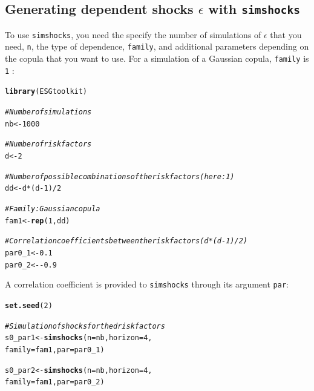 \documentclass[a4paper]{article}\usepackage[]{graphicx}\usepackage[]{color}
\makeatletter
\newcommand{\hlnum}[1]{\textcolor[rgb]{0.686,0.059,0.569}{#1}}%
\newcommand{\hlcom}[1]{\textcolor[rgb]{0.678,0.584,0.686}{\textit{#1}}}%
\newcommand{\hlopt}[1]{\textcolor[rgb]{0,0,0}{#1}}%
\newcommand{\hlstd}[1]{\textcolor[rgb]{0.345,0.345,0.345}{#1}}%
\newcommand{\hlkwb}[1]{\textcolor[rgb]{0.69,0.353,0.396}{#1}}%
\newcommand{\hlkwc}[1]{\textcolor[rgb]{0.333,0.667,0.333}{#1}}%
\newcommand{\hlkwd}[1]{\textcolor[rgb]{0.737,0.353,0.396}{\textbf{#1}}}%
\newenvironment{kframe}{%
 \def\at@end@of@kframe{}%
 \ifinner\ifhmode%
  \def\at@end@of@kframe{\end{minipage}}%
  \begin{minipage}{\columnwidth}%
 \fi\fi%
 \def\FrameCommand##1{\hskip\@totalleftmargin \hskip-\fboxsep
 \colorbox{shadecolor}{##1}\hskip-\fboxsep
     \hskip-\linewidth \hskip-\@totalleftmargin \hskip\columnwidth}%
 \MakeFramed {\advance\hsize-\width
   \@totalleftmargin\z@ \linewidth\hsize
   \@setminipage}}%
 {\par\unskip\endMakeFramed%
 \at@end@of@kframe}
\newenvironment{knitrout}{}{} %
\newcommand{\code}[1]{\mbox{\texttt{#1}}}
\makeatother
\begin{document}
\subsection{Generating dependent shocks $\epsilon$ with \code{simshocks}}
\label{sec:exampleshocks}

To use \code{simshocks}, you need the specify the number of simulations of $\epsilon$ that you need, \code{n}, the type of dependence, \code{family}, and additional parameters depending on the copula that you want to use. For a simulation of a Gaussian copula, \code{family} is \code{1} : 

\begin{knitrout}
\color{fgcolor}\begin{kframe}
\begin{alltt}
\hlkwd{library}\hlstd{(ESGtoolkit)}
\end{alltt}
\end{kframe}
\end{knitrout}

\begin{knitrout}
\color{fgcolor}\begin{kframe}
\begin{alltt}
\hlcom{# Number of simulations}
\hlstd{nb} \hlkwb{<-} \hlnum{1000}

\hlcom{# Number of risk factors}
\hlstd{d} \hlkwb{<-} \hlnum{2}

\hlcom{# Number of possible combinations of the risk factors (here : 1)}
\hlstd{dd} \hlkwb{<-} \hlstd{d}\hlopt{*}\hlstd{(d}\hlopt{-}\hlnum{1}\hlstd{)}\hlopt{/}\hlnum{2}

\hlcom{# Family : Gaussian copula }
\hlstd{fam1} \hlkwb{<-} \hlkwd{rep}\hlstd{(}\hlnum{1}\hlstd{, dd)}

\hlcom{# Correlation coefficients between the risk factors (d*(d-1)/2)}
\hlstd{par0_1} \hlkwb{<-} \hlnum{0.1}
\hlstd{par0_2} \hlkwb{<-} \hlopt{-}\hlnum{0.9}
\end{alltt}
\end{kframe}
\end{knitrout}


A correlation coefficient is provided to \code{simshocks} through its argument \code{par}:

\begin{knitrout}
\color{fgcolor}\begin{kframe}
\begin{alltt}
\hlkwd{set.seed}\hlstd{(}\hlnum{2}\hlstd{)}

\hlcom{# Simulation of shocks for the d risk factors}
\hlstd{s0_par1} \hlkwb{<-} \hlkwd{simshocks}\hlstd{(}\hlkwc{n} \hlstd{= nb,} \hlkwc{horizon} \hlstd{=} \hlnum{4}\hlstd{,}
\hlkwc{family} \hlstd{= fam1,} \hlkwc{par} \hlstd{= par0_1)}

\hlstd{s0_par2} \hlkwb{<-} \hlkwd{simshocks}\hlstd{(}\hlkwc{n} \hlstd{= nb,} \hlkwc{horizon} \hlstd{=} \hlnum{4}\hlstd{,}
\hlkwc{family} \hlstd{= fam1,} \hlkwc{par} \hlstd{= par0_2)}
\end{alltt}
\end{kframe}
\end{knitrout}
\end{document}
